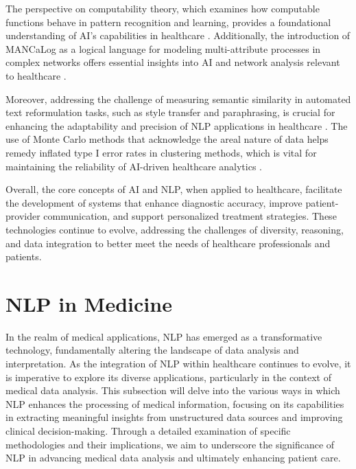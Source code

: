 The perspective on computability theory, which examines how computable functions behave in pattern recognition and learning, provides a foundational understanding of AI's capabilities in healthcare \cite{ryabko2005samplecomplexitycomputationalpattern}. Additionally, the introduction of MANCaLog as a logical language for modeling multi-attribute processes in complex networks offers essential insights into AI and network analysis relevant to healthcare \cite{shakarian2022reasoningcomplexnetworkslogic}.

Moreover, addressing the challenge of measuring semantic similarity in automated text reformulation tasks, such as style transfer and paraphrasing, is crucial for enhancing the adaptability and precision of NLP applications in healthcare \cite{yamshchikov2020styletransferparaphraselookingsensible}. The use of Monte Carlo methods that acknowledge the areal nature of data helps remedy inflated type I error rates in clustering methods, which is vital for maintaining the reliability of AI-driven healthcare analytics \cite{vidanapathirana2022clusterdetectioncapabilitiesaverage}.

Overall, the core concepts of AI and NLP, when applied to healthcare, facilitate the development of systems that enhance diagnostic accuracy, improve patient-provider communication, and support personalized treatment strategies. These technologies continue to evolve, addressing the challenges of diversity, reasoning, and data integration to better meet the needs of healthcare professionals and patients.




\section{NLP in Medicine} \label{sec:NLP in Medicine}

In the realm of medical applications, NLP has emerged as a transformative technology, fundamentally altering the landscape of data analysis and interpretation. As the integration of NLP within healthcare continues to evolve, it is imperative to explore its diverse applications, particularly in the context of medical data analysis. This subsection will delve into the various ways in which NLP enhances the processing of medical information, focusing on its capabilities in extracting meaningful insights from unstructured data sources and improving clinical decision-making. Through a detailed examination of specific methodologies and their implications, we aim to underscore the significance of NLP in advancing medical data analysis and ultimately enhancing patient care.





